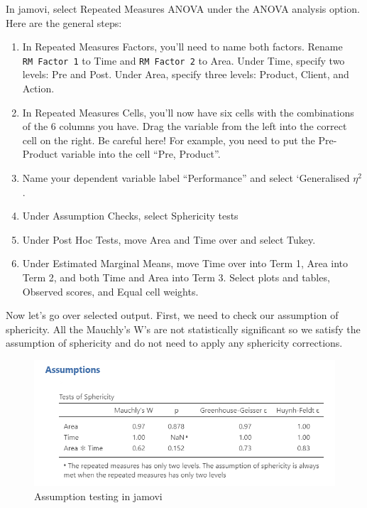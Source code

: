 \documentclass[
]{book}
\begin{document}
In jamovi, select Repeated Measures ANOVA under the ANOVA analysis option. Here are the general steps:

\begin{enumerate}
\def\labelenumi{\arabic{enumi}.}
\item
  In Repeated Measures Factors, you'll need to name both factors. Rename \texttt{RM\ Factor\ 1} to Time and \texttt{RM\ Factor\ 2} to Area. Under Time, specify two levels: Pre and Post. Under Area, specify three levels: Product, Client, and Action.
\item
  In Repeated Measures Cells, you'll now have six cells with the combinations of the 6 columns you have. Drag the variable from the left into the correct cell on the right. Be careful here! For example, you need to put the Pre-Product variable into the cell ``Pre, Product''.
\item
  Name your dependent variable label ``Performance'' and select `Generalised \(\eta^2\).
\item
  Under Assumption Checks, select Sphericity tests
\item
  Under Post Hoc Tests, move Area and Time over and select Tukey.
\item
  Under Estimated Marginal Means, move Time over into Term 1, Area into Term 2, and both Time and Area into Term 3. Select plots and tables, Observed scores, and Equal cell weights.
\end{enumerate}

Now let's go over selected output. First, we need to check our assumption of sphericity. All the Mauchly's W's are not statistically significant so we satisfy the assumption of sphericity and do not need to apply any sphericity corrections.

\begin{figure}

{\centering \includegraphics[width=1\linewidth]{images/06-factorial-anova/rm-factorial_assumption} 

}

\caption{Assumption testing in jamovi}\label{fig:unnamed-chunk-5}
\end{figure}
\end{document}

